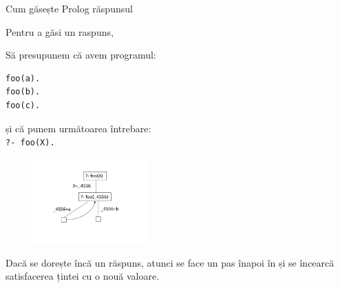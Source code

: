 \documentclass[xcolor=x11names,compress,10pt]{beamer}
\begin{document}
\addtocounter{framenumber}{-1}
\begin{frame}[fragile]{Cum găsește Prolog răspunsul}

Pentru a găsi un raspuns, 

\medskip
\begin{example}
\begin{multicols}{2}
Să presupunem că avem programul: 
\begin{verbatim}
foo(a). 
foo(b). 
foo(c).
\end{verbatim}
și că punem următoarea întrebare: \\
{\color{blue}\texttt{?- foo(X).}}
\columnbreak
\begin{figure}[h]
    \includegraphics[width=0.4\textwidth]{prolog/foo3}
\end{figure}
\end{multicols}
\end{example}
\medskip

Dacă se dorește încă un răspuns, atunci se face un pas înapoi în  și se încearcă satisfacerea țintei cu o nouă valoare.
\end{frame}
\end{document}
